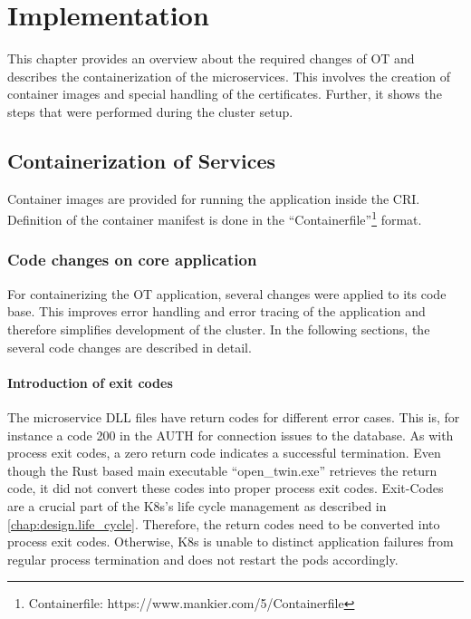 \chapter{Implementation} %

\label{chap:implementation} %


This chapter provides an overview about the required changes of \ac{OT} and describes the containerization of the microservices. This involves the creation of container images and special handling of the certificates.
Further, it shows the steps that were performed during the cluster setup.

\section{Containerization of Services}
Container images are provided for running the application inside the \ac{CRI}. Definition of the container manifest is done in the \enquote{Containerfile}\footnote{Containerfile: https://www.mankier.com/5/Containerfile} format.

\subsection{Code changes on core application}
For containerizing the \ac{OT} application, several changes were applied to its code base. This improves error handling and error tracing of the application and therefore simplifies development of the cluster. In the following sections, the several code changes are described in detail.

\subsubsection*{Introduction of exit codes}
The microservice \ac{DLL} files have return codes for different error cases. This is, for instance a code 200 in the \ac{AUTH} for connection issues to the database. As with process exit codes, a zero return code indicates a successful termination. Even though the Rust based main executable \enquote{open\_twin.exe} retrieves the return code, it did not convert these codes into proper process exit codes. 
Exit-Codes are a crucial part of the \ac{K8s}'s life cycle management as described in \autoref{chap:design.life_cycle}. Therefore, the return codes need to be converted into process exit codes. Otherwise, \ac{K8s} is unable to distinct application failures from regular process termination and does not restart the pods accordingly.

